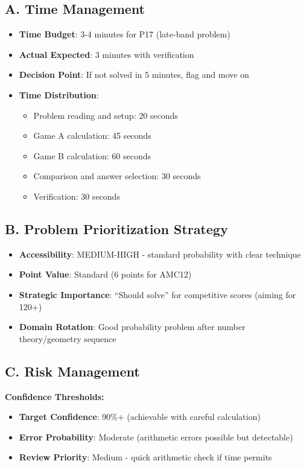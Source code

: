 \documentclass[]{article}
\begin{document}
\begin{competitionbox}
\subsection*{A. Time Management}
\begin{itemize}[leftmargin=*]
    \item \textbf{Time Budget}: 3-4 minutes for P17 (late-band problem)
    \item \textbf{Actual Expected}: 3 minutes with verification
    \item \textbf{Decision Point}: If not solved in 5 minutes, flag and move on
    \item \textbf{Time Distribution}:
    \begin{itemize}
        \item Problem reading and setup: 20 seconds
        \item Game A calculation: 45 seconds
        \item Game B calculation: 60 seconds
        \item Comparison and answer selection: 30 seconds
        \item Verification: 30 seconds
    \end{itemize}
\end{itemize}

\subsection*{B. Problem Prioritization Strategy}
\begin{itemize}[leftmargin=*]
    \item \textbf{Accessibility}: MEDIUM-HIGH - standard probability with clear technique
    \item \textbf{Point Value}: Standard (6 points for AMC12)
    \item \textbf{Strategic Importance}: ``Should solve'' for competitive scores (aiming for 120+)
    \item \textbf{Domain Rotation}: Good probability problem after number theory/geometry sequence
\end{itemize}

\subsection*{C. Risk Management}

\textbf{Confidence Thresholds:}
\begin{itemize}[leftmargin=*]
    \item \textbf{Target Confidence}: 90\%+ (achievable with careful calculation)
    \item \textbf{Error Probability}: Moderate (arithmetic errors possible but detectable)
    \item \textbf{Review Priority}: Medium - quick arithmetic check if time permits
\end{itemize}


\end{competitionbox}
\end{document}

